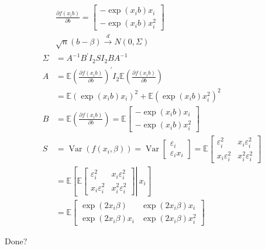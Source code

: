 {{\begin{enumerate}[label=(\alph*)]
{$$
\begin{aligned}
& \frac{\partial f\left(x_{i} b\right)}{\partial b}=\left[\begin{array}{l}
-\exp \left(x_{i} b\right) x_{i} \\
-\exp \left(x_{i} b\right) x_{i}^{2}
\end{array}\right] \\
& \sqrt{n}(b-\beta) \xrightarrow{d} N(0, \Sigma) \\
\Sigma&=A^{-1} B^{\prime} I_{2} S I_{2} B A^{-1} \\
A&=\mathbb{E}\left(\frac{\partial f(x_i b)}{\partial b}\right)^{\prime} I_{2} \mathbb{E}\left(\frac{\partial f(x_i b)}{\partial b}\right) \\
& =\mathbb{E}\left(\exp \left(x_{i} b\right) x_{i}\right)^{2}+\mathbb{E}\left(\exp \left(x_{i} b\right) x_{i}^{2}\right)^{2} \\
B&=\mathbb{E}\left(\frac{\partial f\left(x_{i} b\right)}{\partial b}\right)=\mathbb{E}\left[\begin{array}{l}
-\exp \left(x_{i} b\right) x_{i} \\
-\exp \left(x_{i} b\right) x_{i}^{2}
\end{array}\right] \\
S&=\operatorname{Var}\left(f\left(x_{i}, \beta\right)\right)=\operatorname{Var}\left[\begin{array}{c}
\varepsilon_{i} \\
\varepsilon_{i} x_{i}
\end{array}\right]=\mathbb{E}\left[\begin{array}{cc}
\varepsilon_{i}^{2} & x_{i} \varepsilon_{i}^{2} \\
x_{i} \varepsilon_{i}^{2} & x_{i}^{2} \varepsilon_{i}^{2}
\end{array}\right] \\
& =\mathbb{E}\left[\left.\mathbb{E}\left[\begin{array}{cc}
\varepsilon_{i}^{2} & x_{i} \varepsilon_{i}^{2} \\
x_{i} \varepsilon_{i}^{2} & x_{i}^{2} \varepsilon_{i}^{2}
\end{array}\right] \right\rvert\, x_{i}\right] \\
& =\mathbb{E}\left[\begin{array}{ll}
\exp (2 x_i \beta) & \exp (2 x_i \beta) x_{i} \\
\exp (2 x_i \beta) x_{i} & \exp (2 x_i \beta) x_{i}^{2}
\end{array}\right]
\end{aligned}
$$

\color{red}Done?\color{black}
}
\end{enumerate}
}
}
